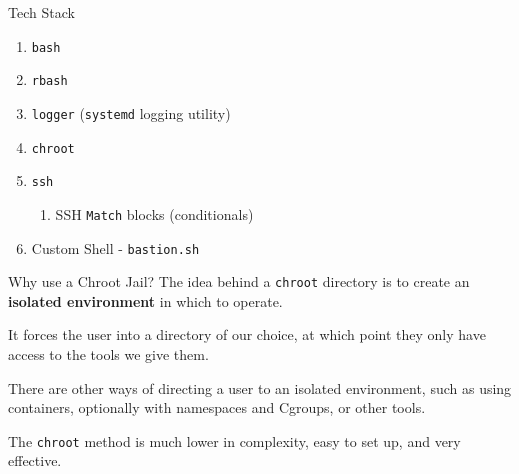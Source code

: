 \documentclass[14pt,compress,dvipsnames,aspectratio=169]{beamer} %
\begin{document}
\begin{frame}{Tech Stack}
    \begin{enumerate}
        \item{\texttt{bash}}
        \item{\texttt{rbash}}
        \item{\texttt{logger} (\texttt{systemd} logging utility)}
        \item{\texttt{chroot}}
        \item{\texttt{ssh}}
            \begin{enumerate}
                \item{SSH \texttt{Match} blocks (conditionals)}
            \end{enumerate}
        \item{Custom Shell - \texttt{bastion.sh}}
    \end{enumerate}
\end{frame}


\begin{frame}{Why use a Chroot Jail?}
    The idea behind a \texttt{chroot} directory is to create an \textbf{isolated
    environment} in which to operate.   

    It forces the user into a directory of our choice, at which point they only have
    access to the tools we give them.  

    There are other ways of directing a user to an isolated environment, such as
    using containers, optionally with namespaces and Cgroups, or other tools.  

    The \texttt{chroot} method is much lower in complexity, easy to set up, and very effective.  
\end{frame}
\end{document}
